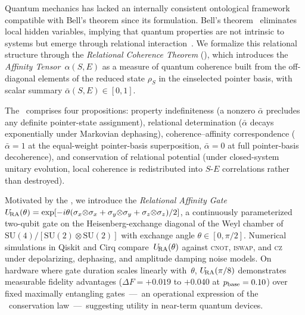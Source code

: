 
Quantum mechanics has lacked an internally consistent ontological framework
compatible with Bell's theorem since its formulation.
Bell's theorem~\cite{Bell1964} eliminates local hidden variables, implying that
quantum properties are not intrinsic to systems but emerge through relational
interaction~\cite{Rovelli1996}.
We formalize this relational structure through the \emph{Relational Coherence
Theorem} (\RCT), which introduces the \emph{Affinity Tensor}~$\alpha(S,E)$
as a measure of quantum coherence built from the off-diagonal elements of
the reduced state $\rho_S$ in the einselected pointer basis, with scalar
summary $\bar\alpha(S,E) \in [0,1]$.

The \RCT\ comprises four propositions:
property indefiniteness (a nonzero $\bar\alpha$ precludes any definite
pointer-state assignment), relational determination ($\bar\alpha$ decays
exponentially under Markovian dephasing), coherence--affinity correspondence
($\bar\alpha = 1$ at the equal-weight pointer-basis superposition,
$\bar\alpha = 0$ at full pointer-basis decoherence), and conservation of
relational potential (under closed-system unitary evolution, local coherence
is redistributed into $S$-$E$ correlations rather than destroyed).

Motivated by the \RCT, we introduce the \emph{Relational Affinity
Gate}~$U_{\!\mathrm{RA}}(\theta) = \exp[-i\theta(\sigma_x{\otimes}\sigma_x +
\sigma_y{\otimes}\sigma_y + \sigma_z{\otimes}\sigma_z)/2]$,
a continuously parameterized two-qubit gate on the Heisenberg-exchange
diagonal of the Weyl chamber of $\mathrm{SU}(4)/[\mathrm{SU}(2)\otimes\mathrm{SU}(2)]$
with exchange angle $\theta \in [0,\pi/2]$.
Numerical simulations in Qiskit and Cirq compare~$U_{\!\mathrm{RA}}(\theta)$ against
\textsc{cnot}, \textsc{iswap}, and \textsc{cz} under depolarizing, dephasing,
and amplitude damping noise models.
On hardware where gate duration scales linearly with~$\theta$,
$U_{\!\mathrm{RA}}(\pi/8)$ demonstrates measurable fidelity advantages
($\Delta F = +0.019$ to $+0.040$ at $p_{\rm base} = 0.10$) over fixed
maximally entangling gates~---~an operational expression of the
\RCT~conservation law~---~suggesting utility in near-term quantum devices.
